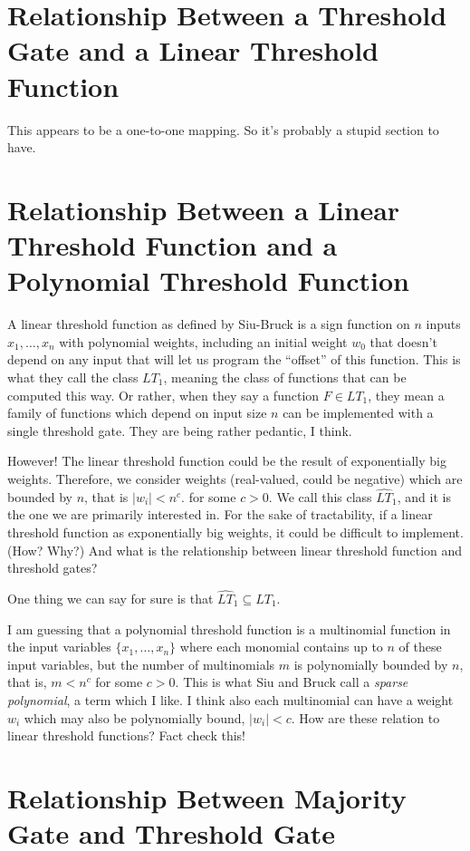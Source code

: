 \documentclass{article}
\begin{document}
\section{Relationship Between a Threshold Gate and a Linear Threshold Function}

This appears to be a one-to-one mapping.
So it's probably a stupid section to have.

\section{Relationship Between a Linear Threshold Function and a
Polynomial Threshold Function}

A linear threshold function as defined by Siu-Bruck is a sign function on
$n$ inputs ${x_1, \ldots, x_n}$ with polynomial weights, including an
initial weight $w_0$ that doesn't depend on any input that will let us
program the ``offset'' of this function. This is what they call the class
$LT_1$, meaning the class of functions that can be computed this way. Or
rather, when they say a function $F\in LT_1$, they mean a family of 
functions which depend on input size $n$ can be implemented with a single
threshold gate. They are being rather pedantic, I think.

However! The linear threshold function could be the result of exponentially
big weights. Therefore, we consider weights (real-valued, could be negative)
which are bounded by $n$, that is $|w_i| < n^c$. for some $c>0$. We call 
this class $\hat{LT}_1$, and it is the one we are primarily interested in.
For the sake of tractability, if a linear threshold function as 
exponentially big weights, it could be difficult to implement.
(How? Why?) And what is the relationship between linear threshold function
and threshold gates?

One thing we can say for sure is that $\hat{LT}_1 \subseteq LT_1$.

I am guessing that a polynomial threshold function is a multinomial
function in the input variables $\{x_1, \ldots, x_n\}$ where each
monomial contains up to $n$ of these input variables, but the number of
multinomials $m$ is polynomially bounded by $n$, that is, $m < n^c$ for
some $c > 0$. This is what Siu and Bruck call a \emph{sparse polynomial},
a term which I like. I think also each multinomial can have a weight
$w_i$ which may also be polynomially bound, $|w_i| < c$.
How are these relation to linear threshold functions? Fact check this!

\section{Relationship Between Majority Gate and Threshold Gate}
\end{document}
